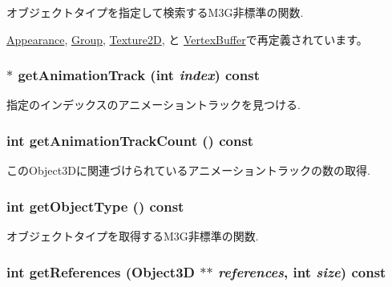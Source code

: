 オブジェクトタイプを指定して検索するM3G非標準の関数. 

\hyperlink{classm3g_1_1Appearance_4dadb21b568b0230fac106f15040138c}{Appearance}, \hyperlink{classm3g_1_1Group_4dadb21b568b0230fac106f15040138c}{Group}, \hyperlink{classm3g_1_1Texture2D_4dadb21b568b0230fac106f15040138c}{Texture2D}, と \hyperlink{classm3g_1_1VertexBuffer_4dadb21b568b0230fac106f15040138c}{VertexBuffer}で再定義されています。\hypertarget{classm3g_1_1Object3D_f0978f3f2efe3227ca613da3361424dd}{
\subsubsection[{getAnimationTrack}]{ $\ast$ getAnimationTrack (int {\em index}) const}}
\label{classm3g_1_1Object3D_f0978f3f2efe3227ca613da3361424dd}


指定のインデックスのアニメーショントラックを見つける. \hypertarget{classm3g_1_1Object3D_0926843b66090795972850376b8e4e6c}{
\subsubsection[{getAnimationTrackCount}]{\setlength{\rightskip}{0pt plus 5cm}int getAnimationTrackCount () const}}
\label{classm3g_1_1Object3D_0926843b66090795972850376b8e4e6c}


このObject3Dに関連づけられているアニメーショントラックの数の取得. \hypertarget{classm3g_1_1Object3D_06be1b37b707b5f227cba2308043f3df}{
\subsubsection[{getObjectType}]{\setlength{\rightskip}{0pt plus 5cm}int getObjectType () const}}
\label{classm3g_1_1Object3D_06be1b37b707b5f227cba2308043f3df}


オブジェクトタイプを取得するM3G非標準の関数. \hypertarget{classm3g_1_1Object3D_ddf91fbaaa866aa7aad5d530a69feba8}{
\subsubsection[{getReferences}]{\setlength{\rightskip}{0pt plus 5cm}int getReferences ({\bf Object3D} $\ast$$\ast$ {\em references}, \/  int {\em size}) const}}
\label{classm3g_1_1Object3D_ddf91fbaaa866aa7aad5d530a69feba8}


